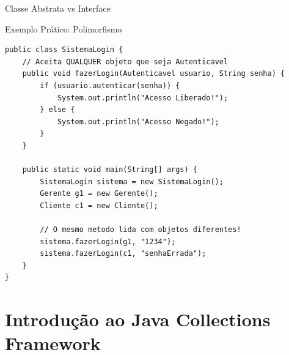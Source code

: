 \documentclass[9pt]{beamer}
\begin{document}
\begin{frame}{Classe Abstrata vs Interface}
    \renewcommand{\arraystretch}{1.3}
    \begin{center}
    \end{center}
\end{frame}

\begin{frame}[fragile]{Exemplo Prático: Polimorfismo}
    \begin{lstlisting}
public class SistemaLogin {
    // Aceita QUALQUER objeto que seja Autenticavel
    public void fazerLogin(Autenticavel usuario, String senha) {
        if (usuario.autenticar(senha)) {
            System.out.println("Acesso Liberado!");
        } else {
            System.out.println("Acesso Negado!");
        }
    }

    public static void main(String[] args) {
        SistemaLogin sistema = new SistemaLogin();
        Gerente g1 = new Gerente();
        Cliente c1 = new Cliente();

        // O mesmo metodo lida com objetos diferentes!
        sistema.fazerLogin(g1, "1234");
        sistema.fazerLogin(c1, "senhaErrada");
    }
}
    \end{lstlisting}
\end{frame}

\section{Introdução ao Java Collections Framework}
\end{document}
